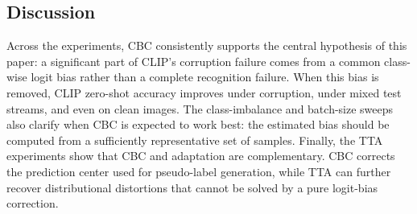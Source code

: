 \subsection{Discussion}
\label{subsec:experiment_discussion}

Across the experiments, CBC consistently supports the central hypothesis of this paper: a significant part of CLIP's corruption failure comes from a common class-wise logit bias rather than a complete recognition failure.
When this bias is removed, CLIP zero-shot accuracy improves under corruption, under mixed test streams, and even on clean images.
The class-imbalance and batch-size sweeps also clarify when CBC is expected to work best: the estimated bias should be computed from a sufficiently representative set of samples.
Finally, the TTA experiments show that CBC and adaptation are complementary.
CBC corrects the prediction center used for pseudo-label generation, while TTA can further recover distributional distortions that cannot be solved by a pure logit-bias correction.
